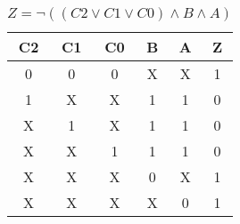 
\begin{center}
    \begin{table}[h] \caption{\(Z = \lnot ((C2 \lor C1 \lor C0) \land B \land A) \)}
        \begin{center}
            \begin{tabular}{|c|c|c|c|c||c|} \hline
            C2 & C1 & C0 & B & A & Z \\ \hline\hline
            0  & 0  & 0  & X & X & 1 \\ \hline
            1  & X  & X  & 1 & 1 & 0 \\ \hline
            X  & 1  & X  & 1 & 1 & 0 \\ \hline
            X  & X  & 1  & 1 & 1 & 0 \\ \hline
            X  & X  & X  & 0 & X & 1 \\ \hline
            X  & X  & X  & X & 0 & 1 \\ \hline
            \end{tabular}
        \end{center}
    \end{table}
\end{center}
